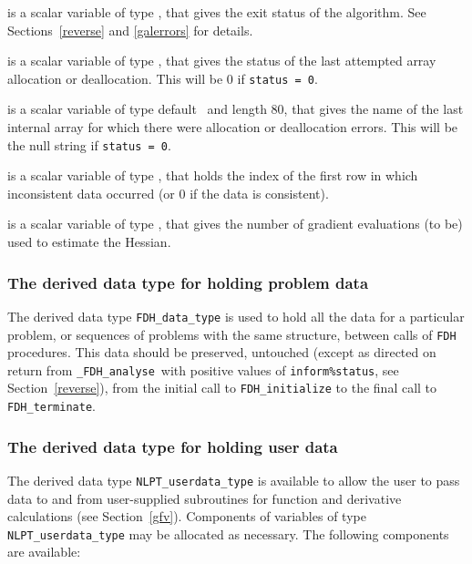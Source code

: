 \documentclass{galahad}
\newcommand{\packagename}{FDH}
\newcommand{\fullpackagename}{\libraryname\_\packagename}
\newcommand{\solver}{{\tt \fullpackagename\_analyse}}
\begin{document}
\begin{description}
 is a scalar variable of type \integer, that gives the
exit status of the algorithm. 
See Sections~\ref{reverse} and \ref{galerrors}
for details.

 is a scalar variable of type \integer, that gives
the status of the last attempted array allocation or deallocation.
This will be 0 if {\tt status = 0}.

 is a scalar variable of type default \character\
and length 80, that  gives the name of the last internal array 
for which there were allocation or deallocation errors.
This will be the null string if {\tt status = 0}. 

 is a scalar variable of type \integer, that holds the 
index of the first row in which inconsistent data occurred (or 0 if the data is 
consistent).

 is a scalar variable of type \integer, that gives the
number of gradient evaluations (to be) used to estimate the Hessian.

\end{description}


\subsubsection{The derived data type for holding problem data}\label{typedata}
The derived data type 
{\tt \packagename\_data\_type} 
is used to hold all the data for a particular problem,
or sequences of problems with the same structure, between calls of 
{\tt \packagename} procedures. 
This data should be preserved, untouched (except as directed on
return from \solver\ with positive values of {\tt inform\%status}, see
Section~\ref{reverse}),
from the initial call to 
{\tt \packagename\_initialize}
to the final call to
{\tt \packagename\_terminate}.


\subsubsection{The derived data type for holding user data}\label{typeuserdata}
The derived data type 
{\tt NLPT\_userdata\_type} 
is available to allow the user to pass data to and from user-supplied 
subroutines for function and derivative calculations (see Section~\ref{gfv}).
Components of variables of type {\tt NLPT\_userdata\_\-type} may be allocated as
necessary. The following components are available:
\end{document}
